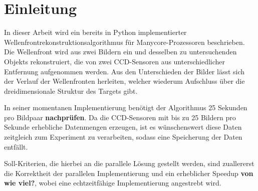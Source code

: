 \chapter{Einleitung}

\begin{correctmore}
	In dieser Arbeit wird ein bereits in Python implementierter Wellenfrontrekonstruktionsalgorithmus für Manycore-Prozessoren beschrieben.
	Die Wellenfront wird aus zwei Bildern ein und desselben zu untersuchenden Objekts rekonstruiert, die von zwei CCD-Sensoren aus unterschiedlicher Entfernung aufgenommen werden. Aus den Unterschieden der Bilder lässt sich der Verlauf der Wellenfronten herleiten, welcher wiederum Aufschluss über die dreidimensionale Struktur des Targets gibt. 
	
	In seiner momentanen Implementierung benötigt der Algorithmus 25 Sekunden pro Bildpaar \textbf{nachprüfen}. Da die CCD-Sensoren mit bis zu 25 Bildern pro Sekunde erhebliche Datenmengen erzeugen, ist es wünschenswert diese Daten zeitgleich zum Experiment zu verarbeiten, sodass eine Speicherung der Daten entfällt. 
	
	Soll-Kriterien, die hierbei an die parallele Lösung gestellt werden, sind zuallererst die Korrektheit der parallelen Implementierung und ein erheblicher Speedup \textbf{von wie viel?}, wobei eine echtzeitfähige Implementierung angestrebt wird.
\end{correctmore}	

\iffalse
- Anwendungsbeschriebung:
-> Wellenfrontrekonstruktionsalgorithmus liegt in Python implementiert vor
-> Rekonstruktion der Wellenfront aus Bildern 2er CCD Kameras in verschiedenem Abstand
- Motivation
-> momentaner Wellenfrontrekonstruktionsalgorithmus benötigt 25s/Frame
-> Kamera liefert 10 Frames/s
-> Daten müssen zwischengespeichert werden
- Einführen der Soll-Kriterien:
-> korrekte Rekonstruktion der Wellenfronten
-> deutliche Beschnleunigung der momentanen Implementierung (5x+)
\fi